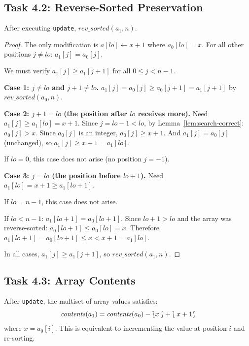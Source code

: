 \subsection{Task 4.2: Reverse-Sorted Preservation}

\begin{theorem}\label{thm:update-sorted}
After executing \texttt{update}, $\mathit{rev\_sorted}(a_1, n)$.
\end{theorem}

\begin{proof}
The only modification is $a[\mathit{lo}] \gets x + 1$ where $a_0[\mathit{lo}] = x$.
For all other positions $j \neq \mathit{lo}$: $a_1[j] = a_0[j]$.

We must verify $a_1[j] \geq a_1[j{+}1]$ for all $0 \leq j < n{-}1$.

\textbf{Case 1: $j \neq \mathit{lo}$ and $j+1 \neq \mathit{lo}$.}
$a_1[j] = a_0[j] \geq a_0[j{+}1] = a_1[j{+}1]$ by $\mathit{rev\_sorted}(a_0, n)$.

\textbf{Case 2: $j+1 = \mathit{lo}$ (the position after $\mathit{lo}$ receives more).}
Need $a_1[j] \geq a_1[\mathit{lo}] = x + 1$.
Since $j = \mathit{lo} - 1 < \mathit{lo}$, by Lemma~\ref{lem:search-correct}: $a_0[j] > x$.
Since $a_0[j]$ is an integer, $a_0[j] \geq x + 1$.
And $a_1[j] = a_0[j]$ (unchanged), so $a_1[j] \geq x + 1 = a_1[\mathit{lo}]$.

If $\mathit{lo} = 0$, this case does not arise (no position $j = -1$).

\textbf{Case 3: $j = \mathit{lo}$ (the position before $\mathit{lo}+1$).}
Need $a_1[\mathit{lo}] = x + 1 \geq a_1[\mathit{lo}{+}1]$.

If $\mathit{lo} = n-1$, this case does not arise.

If $\mathit{lo} < n{-}1$: $a_1[\mathit{lo}{+}1] = a_0[\mathit{lo}{+}1]$.
Since $\mathit{lo}{+}1 > \mathit{lo}$ and the array was reverse-sorted:
$a_0[\mathit{lo}{+}1] \leq a_0[\mathit{lo}] = x$.
Therefore $a_1[\mathit{lo}{+}1] = a_0[\mathit{lo}{+}1] \leq x < x + 1 = a_1[\mathit{lo}]$.

In all cases, $a_1[j] \geq a_1[j{+}1]$, so $\mathit{rev\_sorted}(a_1, n)$.
\end{proof}

\subsection{Task 4.3: Array Contents}

\begin{theorem}\label{thm:update-contents}
After \texttt{update}, the multiset of array values satisfies:
\[
  \mathit{contents}(a_1) = \mathit{contents}(a_0) - \lbag x \rbag + \lbag x+1 \rbag
\]
where $x = a_0[i]$. This is equivalent to incrementing the value at position $i$
and re-sorting.
\end{theorem}

